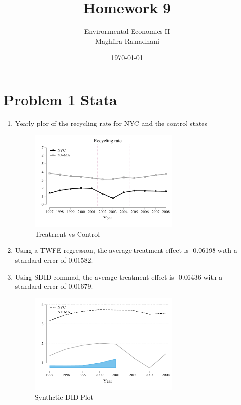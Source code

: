 \documentclass{article}
\begin{document}
 
\title{Homework 9}
\author{Environmental Economics II\\
Maghfira Ramadhani}
\date{\today}
\maketitle

\section*{Problem 1 Stata}
\begin{enumerate}
\item Yearly plor of the recycling rate for NYC and the control states
\begin{figure}[H]
    \centering
    \includegraphics[width=0.7\textwidth]{./figure/recyclingrate.pdf}
    \caption{Treatment vs Control}
    \label{f:treatment_vs_control} 
\end{figure}

\item Using a TWFE regression, the average treatment effect is -0.06198 with a standard error of 0.00582.

\item Using SDID commad, the average treatment effect is -0.06436 with a standard error of 0.00679.
\begin{figure}[H]
    \centering
    \includegraphics[width=0.7\textwidth]{./figure/sdid.pdf}
    \caption{Synthetic DID Plot}
    \label{f:sdid} 
\end{figure}


\end{enumerate}
\end{document}
